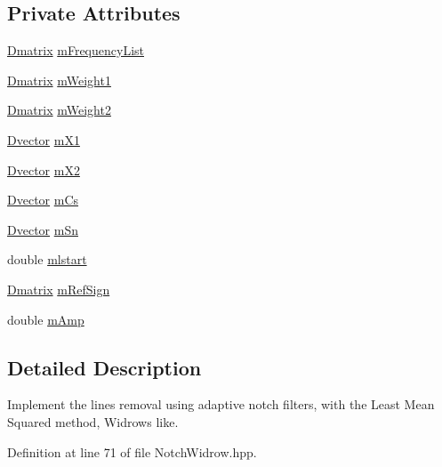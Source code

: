 \subsection*{Private Attributes}
\begin{DoxyCompactItemize}
\item 
\hyperlink{namespacetsa_ad260cd21c1891c4ed391fe788569aba4}{Dmatrix} \hyperlink{classtsa_1_1_notch_widrow_a391286f42ba0dbede784bc90446833e4}{m\+Frequency\+List}
\item 
\hyperlink{namespacetsa_ad260cd21c1891c4ed391fe788569aba4}{Dmatrix} \hyperlink{classtsa_1_1_notch_widrow_a73d8df3ec7105a4f481edc807123df5c}{m\+Weight1}
\item 
\hyperlink{namespacetsa_ad260cd21c1891c4ed391fe788569aba4}{Dmatrix} \hyperlink{classtsa_1_1_notch_widrow_a942bc010a02f09c124589a5f467b9100}{m\+Weight2}
\item 
\hyperlink{namespacetsa_a8900fb03d849baf447a1a0efe2561fb2}{Dvector} \hyperlink{classtsa_1_1_notch_widrow_af4771f4a7d4b59bb804ee77679e13284}{m\+X1}
\item 
\hyperlink{namespacetsa_a8900fb03d849baf447a1a0efe2561fb2}{Dvector} \hyperlink{classtsa_1_1_notch_widrow_adde0e4f47ee24c548101b61e864da073}{m\+X2}
\item 
\hyperlink{namespacetsa_a8900fb03d849baf447a1a0efe2561fb2}{Dvector} \hyperlink{classtsa_1_1_notch_widrow_afa8a7585ecbd88d110ab096e344d2c0c}{m\+Cs}
\item 
\hyperlink{namespacetsa_a8900fb03d849baf447a1a0efe2561fb2}{Dvector} \hyperlink{classtsa_1_1_notch_widrow_a7b4784ec034908142ed52fa9fe33363c}{m\+Sn}
\item 
double \hyperlink{classtsa_1_1_notch_widrow_a16272fe55b1ddf22dcc04e7db1e92397}{mlstart}
\item 
\hyperlink{namespacetsa_ad260cd21c1891c4ed391fe788569aba4}{Dmatrix} \hyperlink{classtsa_1_1_notch_widrow_a11653cedb6210434d45a8f30e1dc37b8}{m\+Ref\+Sign}
\item 
double \hyperlink{classtsa_1_1_notch_widrow_acbc33d87e8a0dd156dacf5bfe40ff493}{m\+Amp}
\end{DoxyCompactItemize}


\subsection{Detailed Description}
Implement the lines removal using adaptive notch filters, with the Least Mean Squared method, Widrow\textquotesingle{}s like. 

Definition at line 71 of file Notch\+Widrow.\+hpp.



